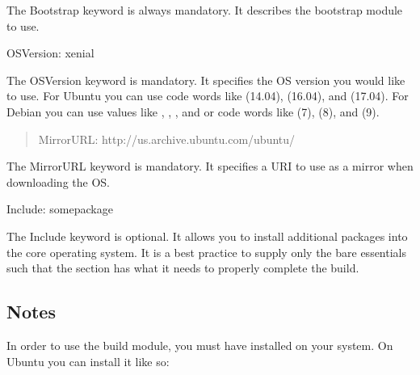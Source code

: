 \documentclass[letterpaper,10pt,english]{sphinxmanual}
\begin{document}
The Bootstrap keyword is always mandatory. It describes the bootstrap module to
use.

%
\begin{sphinxVerbatim}[commandchars=\\\{\}]
OSVersion: xenial
\end{sphinxVerbatim}

The OSVersion keyword is mandatory. It specifies the OS version you would like
to use. For Ubuntu you can use code words like  (14.04), 
(16.04), and  (17.04). For Debian you can use values like ,
, , and  or code words like  (7),
 (8), and  (9).
\begin{quote}

%
\begin{sphinxVerbatim}[commandchars=\\\{\}]
MirrorURL:  http://us.archive.ubuntu.com/ubuntu/
\end{sphinxVerbatim}
\end{quote}

The MirrorURL keyword is mandatory. It specifies a URI to use as a mirror when
downloading the OS.

%
\begin{sphinxVerbatim}[commandchars=\\\{\}]
Include: somepackage
\end{sphinxVerbatim}

The Include keyword is optional. It allows you to install additional packages
into the core operating system. It is a best practice to supply only the bare
essentials such that the  section has what it needs to properly
complete the build.


\subsection{Notes}
\label{\detokenize{appendix:id14}}
In order to use the  build module, you must have 
installed on your system. On Ubuntu you can install it like so:
\end{document}
